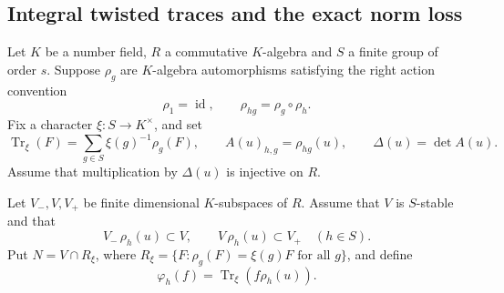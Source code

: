 \subsection{Integral twisted traces and the exact norm loss}
\label{sec:sr-twisted-trace-descent}

Let \(K\) be a number field, \(R\) a commutative \(K\)-algebra and
\(S\) a finite group of order \(s\).
Suppose \(\rho_g\) are \(K\)-algebra automorphisms satisfying the
right action convention
\[
             \rho_1=\operatorname{id},\qquad
             \rho_{hg}=\rho_g\circ\rho_h .
\]
Fix a character \(\xi:S\to K^\times\), and set
\[
 \operatorname{Tr}_\xi(F)=\sum_{g\in S}\xi(g)^{-1}\rho_g(F),
 \qquad
 A(u)_{h,g}=\rho_{hg}(u),\qquad \Delta(u)=\det A(u).
\]
Assume that multiplication by \(\Delta(u)\) is injective on \(R\).

Let \(V_-,V,V_+\) be finite dimensional \(K\)-subspaces of \(R\).
Assume that \(V\) is \(S\)-stable and that
\[
       V_-\,\rho_h(u)\subset V,\qquad V\,\rho_h(u)\subset V_+
                         \quad(h\in S).
\]
Put \(N=V\cap R_\xi\), where
\(R_\xi=\{F:\rho_g(F)=\xi(g)F\text{ for all }g\}\), and define
\[
             \varphi_h(f)=\operatorname{Tr}_\xi(f\rho_h(u)).
\]

